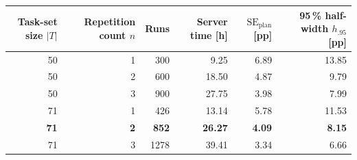 \begin{tabular}{@{}rrrrrr@{}}
  \toprule
  \shortstack{Task-set size\\$|T|$} & \shortstack{Repetition count\\$n$} & Runs & Server time [h] & \shortstack{$\mathrm{SE}_{\mathrm{plan}}$\\{}[pp]} & \shortstack{95\,\% half-width $h_{.95}$\\{}[pp]} \\
  \midrule
  50 & 1 & 300 & 9.25 & 6.89 & 13.85 \\ 
  \rowcolor{black!6} 50 & 2 & 600 & 18.50 & 4.87 & 9.79 \\ 
  50 & 3 & 900 & 27.75 & 3.98 & 7.99 \\ 
  \rowcolor{black!6} 71 & 1 & 426 & 13.14 & 5.78 & 11.53 \\ 
  \textbf{71} & \textbf{2} & \textbf{852} & \textbf{26.27} & \textbf{4.09} & \textbf{8.15} \\ 
  \rowcolor{black!6} 71 & 3 & 1278 & 39.41 & 3.34 & 6.66 \\ 
  \bottomrule
\end{tabular}
